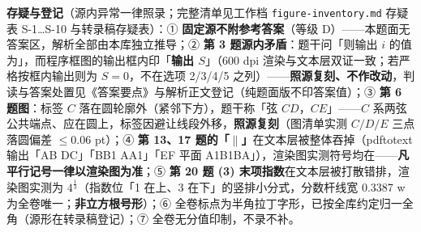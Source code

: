 \begin{gktip}
\textbf{存疑与登记}（源内异常一律照录；完整清单见工作档 \texttt{figure-inventory.md} 存疑表 S-1…S-10 与转录稿存疑表）：① \textbf{固定源不附参考答案}（等级 D）——本题面无答案区，解析全部由本库独立推导；② \textbf{第 3 题源内矛盾}：题干问「则输出 \(i\) 的值为」，而程序框图的输出框内印「\textbf{输出 \(S\)}」（600 dpi 渲染与文本层双证一致；若严格按框内输出则为 \(S=0\)，不在选项 2/3/4/5 之列）——\textbf{照源复刻、不作改动}，判读与答案处置见《答案要点》与解析正文登记（纯题面版不印答案值）；③ \textbf{第 6 题图}：标签 \(C\) 落在圆轮廓外（紧邻下方），题干称「弦 \(CD\)，\(CE\)」——\(C\) 系两弦公共端点、应在圆上，标签因避让线段外移，\textbf{照源复刻}（图清单实测 \(C/D/E\) 三点落圆偏差 \(\leqslant0.06\) pt）；④ \textbf{第 13、17 题的「$\parallel$」}在文本层被整体吞掉（pdftotext 输出「AB DC」「BB1 AA1」「EF 平面 A1B1BA」），渲染图实测符号均在——\textbf{凡平行记号一律以渲染图为准}；⑤ \textbf{第 20 题 (3) 末项指数}在文本层被打散错排，渲染图实测为 \textbf{\(4^{\frac{1}{3}}\)}（指数位「1 在上、3 在下」的竖排小分式，分数杆线宽 0.3387 w 为全卷唯一；\textbf{非立方根号形}）；⑥ 全卷标点为半角拉丁字形，已按全库约定归一全角（源形在转录稿登记）；⑦ 全卷无分值印制，不录不补。
\end{gktip}



